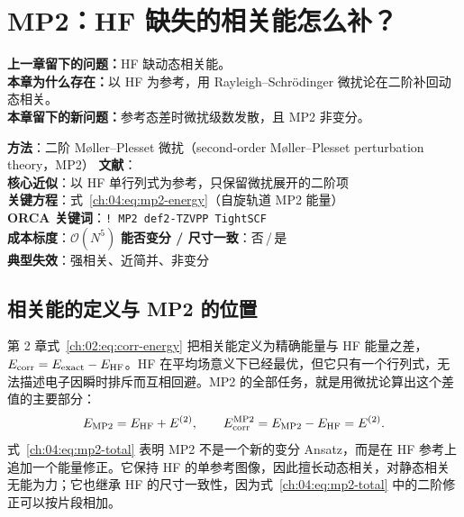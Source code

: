 
\section{MP2：HF 缺失的相关能怎么补？}
\label{ch:04:sec:title}

\begin{problemchain}
\textbf{上一章留下的问题：}HF 缺动态相关能。\\
\textbf{本章为什么存在：}以 HF 为参考，用 Rayleigh--Schrödinger 微扰论在二阶补回动态相关。\\
\textbf{本章留下的新问题：}参考态差时微扰级数发散，且 MP2 非变分。
\end{problemchain}

\begin{methodcard}
\textbf{方法}：二阶 Møller--Plesset 微扰（second-order Møller--Plesset perturbation theory，MP2）\quad
\textbf{文献}：\citep{moller1934,grimme2003scsmp2}\\
\textbf{核心近似}：以 HF 单行列式为参考，只保留微扰展开的二阶项\\
\textbf{关键方程}：式~\eqref{ch:04:eq:mp2-energy}（自旋轨道 MP2 能量）\\
\textbf{ORCA 关键词}：\texttt{! MP2 def2-TZVPP TightSCF}\\
\textbf{成本标度}：$\mathcal{O}(N^5)$ \quad
\textbf{能否变分 / 尺寸一致}：否\,/\,是\\
\textbf{典型失效}：强相关、近简并、非变分
\end{methodcard}

\subsection{相关能的定义与 MP2 的位置}
\label{ch:04:sec:corr}

第 2 章式~\eqref{ch:02:eq:corr-energy} 把相关能定义为精确能量与 HF 能量之差，$E_{\mathrm{corr}}=E_{\mathrm{exact}}-E_{\mathrm{HF}}$。HF 在平均场意义下已经最优，但它只有一个行列式，无法描述电子因瞬时排斥而互相回避。MP2 的全部任务，就是用微扰论算出这个差值的主要部分：
\begin{equation}
E_{\mathrm{MP2}} = E_{\mathrm{HF}} + E^{(2)},
\qquad
E_{\mathrm{corr}}^{\mathrm{MP2}}
= E_{\mathrm{MP2}} - E_{\mathrm{HF}} = E^{(2)} .
\label{ch:04:eq:mp2-total}
\end{equation}
式~\eqref{ch:04:eq:mp2-total} 表明 MP2 不是一个新的变分 Ansatz，而是在 HF 参考上追加一个能量修正。它保持 HF 的单参考图像，因此擅长动态相关，对静态相关无能为力；它也继承 HF 的尺寸一致性，因为式~\eqref{ch:04:eq:mp2-total} 中的二阶修正可以按片段相加。

